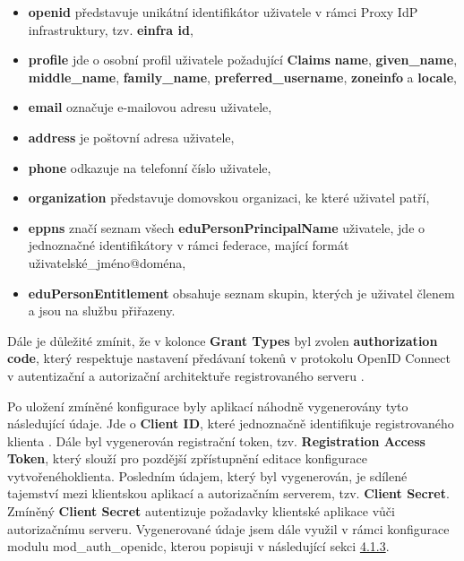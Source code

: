 \documentclass[
  printed, %
  twoside, %
  table,   %
  nolof,     %
  nolot,     %
]{fithesis3}
\begin{document}
\begin{itemize}
    \item \textbf{openid} představuje unikátní identifikátor uživatele v rámci Proxy IdP infrastruktury, tzv. \textbf{einfra id},
    \item \textbf{profile} jde o osobní profil uživatele požadující \textbf{Claims} \textbf{name}, \textbf{given\_name}, \textbf{middle\_name}, \textbf{family\_name}, \textbf{preferred\_username}, \textbf{zoneinfo} a \textbf{locale},
    \item \textbf{email} označuje e-mailovou adresu uživatele,
    \item \textbf{address} je poštovní adresa uživatele,
    \item \textbf{phone} odkazuje na telefonní číslo uživatele,
    
    \item \textbf{organization} představuje domovskou organizaci, ke které uživatel patří,
    \item \textbf{eppns} značí seznam všech \textbf{eduPersonPrincipalName} uživatele, jde o jednoznačné identifikátory v rámci federace, mající formát uživatelské\_jméno@doména,  
    \item \textbf{eduPersonEntitlement} obsahuje seznam skupin, kterých je uživatel členem a jsou na službu  přiřazeny.
    
\end{itemize}
Dále je důležité zmínit, že v kolonce \textbf{Grant Types} byl zvolen \textbf{authorization code}, který respektuje nastavení předávaní tokenů v protokolu OpenID Connect v autentizační a autorizační architektuře registrovaného serveru .  \par

Po uložení zmíněné konfigurace byly aplikací náhodně vygenerovány tyto následující údaje. Jde o \textbf{Client ID}, které jednoznačně identifikuje registrovaného klienta . Dále byl vygenerován registrační token, tzv. \textbf{Registration Access Token}, který slouží pro pozdější zpřístupnění editace konfigurace vytvořeného\break klienta. Posledním údajem, který byl vygenerován, je sdílené tajemství mezi klientskou aplikací a autorizačním serverem, tzv. \textbf{Client Secret}. Zmíněný \textbf{Client Secret} autentizuje požadavky klientské aplikace vůči autorizačnímu serveru. Vygenerované údaje jsem dále využil v rámci konfigurace modulu mod\_auth\_openidc, kterou popisuji v následující sekci \hyperref[sec:mod-conf]{4.1.3}.
\end{document}
